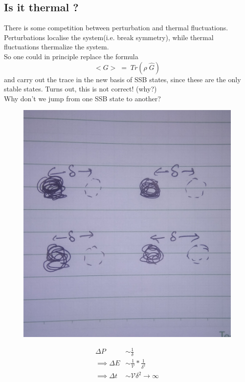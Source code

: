 \documentclass[12pt]{article}
\begin{document}
\newpage
\subsection{Is it thermal ?}
There is some competition between perturbation and thermal fluctuations.\\
Perturbations localise the system(i.e. break symmetry), while thermal fluctuations thermalize the system.\\
So one could in principle replace the formula
\begin{equation*}
    <G>\;=\;Tr(\rho \;\hat{G})
\end{equation*}
and carry out the trace in the new basis of SSB states, since these are the only stable states. Turns out, this is not correct! (why?)\\
\newline
Why don't we jump from one SSB state to another?\\

\begin{figure}[h]
\centering
\includegraphics[scale=0.1]{IMG_20200722_230039.jpg}
\end{figure}

\begin{align*}
    \Delta P &\sim \frac{1}{\delta}\\
    \implies \Delta E &\sim \frac{1}{\mathcal{V}}*\frac{1}{\delta^2}\\
    \implies \Delta t &\sim \mathcal{V}\delta^2 \to\infty
\end{align*}
\end{document}
